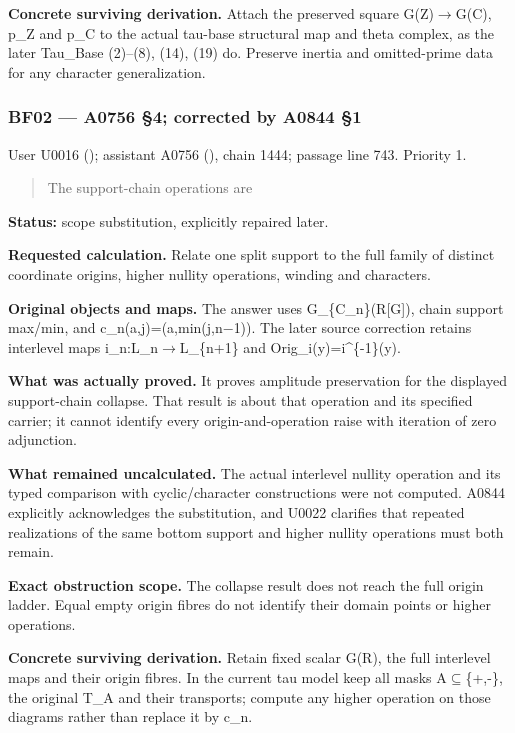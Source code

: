 \documentclass[10pt,a4paper,oneside]{report}
\begin{document}
\textbf{Concrete surviving derivation.} Attach the preserved square
G(Z)\allowbreak{}\ensuremath{→}\allowbreak{}G(C), p\_Z and p\_C to the
actual tau-base structural map and theta complex, as the later Tau\_Base
(2)--(8), (14), (19) do. Preserve inertia and omitted-prime data for any
character generalization.

\subsubsection{BF02 --- A0756 §4; corrected by A0844
§1}\label{bf02-a0756-4-corrected-by-a0844-1}

User U0016 (\protect{});
assistant A0756 (\protect{}),
chain 1444; passage line 743. Priority 1.

\begin{quote}
The support-chain operations are
\end{quote}

\textbf{Status:} scope substitution, explicitly repaired later.

\textbf{Requested calculation.} Relate one split support to the full
family of distinct coordinate origins, higher nullity operations,
winding and characters.

\textbf{Original objects and maps.} The answer uses
G\_\{C\_n\}(R{[}G{]}), chain support max/min, and
c\_n(a,j)=(a,min(j,n\allowbreak{}\ensuremath{−}\allowbreak{}1)). The
later source correction retains interlevel maps
i\_n:L\_n\allowbreak{}\ensuremath{→}\allowbreak{}L\_\{n+1\} and
Orig\_i(y)=i\^{}\{-1\}(y).

\textbf{What was actually proved.} It proves amplitude preservation for
the displayed support-chain collapse. That result is about that
operation and its specified carrier; it cannot identify every
origin-and-operation raise with iteration of zero adjunction.

\textbf{What remained uncalculated.} The actual interlevel nullity
operation and its typed comparison with cyclic/character constructions
were not computed. A0844 explicitly acknowledges the substitution, and
U0022 clarifies that repeated realizations of the same bottom support
and higher nullity operations must both remain.

\textbf{Exact obstruction scope.} The collapse result does not reach the
full origin ladder. Equal empty origin fibres do not identify their
domain points or higher operations.

\textbf{Concrete surviving derivation.} Retain fixed scalar G(R), the
full interlevel maps and their origin fibres. In the current tau model
keep all masks A\allowbreak{}\ensuremath{⊆}\allowbreak{}\{+,-\}, the
original T\_A and their transports; compute any higher operation on
those diagrams rather than replace it by c\_n.
\end{document}
